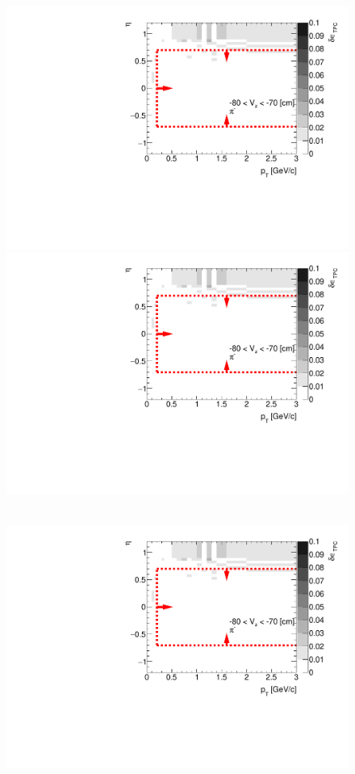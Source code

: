 \begin{figure}[hb]
{		\includegraphics[width=\linewidth,page=55]{graphics/systematicsEfficiency/deadMaterial/secondaries_Unbinned_SDCD_.pdf}\\
		\includegraphics[width=\linewidth,page=58]{graphics/systematicsEfficiency/deadMaterial/secondaries_Unbinned_SDCD_.pdf}\\
	}~
	\parbox{0.325\textwidth}{
		\centering
		\includegraphics[width=\linewidth,page=50]{graphics/systematicsEfficiency/deadMaterial/secondaries_Unbinned_SDCD_.pdf}\\
}
\end{figure}
